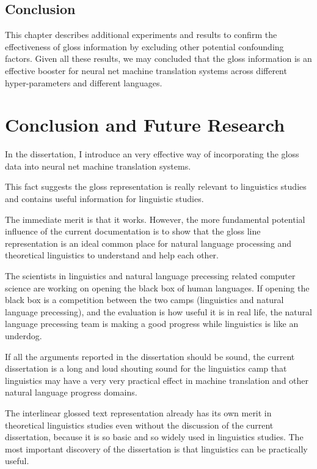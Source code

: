 \documentclass[final]{ua-thesis}
\numberwithin{equation}{section}
\begin{document}
\section{Conclusion}

This chapter describes additional experiments and results to confirm the effectiveness of gloss information by excluding other potential confounding factors.
Given all these results, we may concluded that the gloss information is an effective booster for neural net machine translation systems across different hyper-parameters and different languages.       
\chapter{Conclusion and Future Research}

In the dissertation, I introduce an very effective way of incorporating the gloss data into neural net machine translation systems.

This fact suggests the gloss representation is really relevant to linguistics studies and contains useful information for linguistic studies. 

The immediate merit is that it works. However, the more fundamental potential influence of the current documentation is to show that the gloss line representation is an ideal common place for natural language processing and theoretical linguistics to understand and help each other. 

The scientists in linguistics and natural language precessing related computer science are working on opening the black box of human languages. 
If opening the black box is a competition between the two camps (linguistics and natural language precessing), and the evaluation is how useful it is in real life, the natural language precessing team is making a good progress while linguistics is like an underdog. 

If all the arguments reported in the dissertation should be sound, the current dissertation is a long and loud shouting sound for the linguistics camp that linguistics may have a very very practical effect in machine translation and other natural language progress domains. 

The interlinear glossed text representation already has its own merit in theoretical linguistics studies even without the discussion of the current dissertation, because it is so basic and so widely used in linguistics studies. The most important discovery of the dissertation is that linguistics can be practically useful.
\end{document}
